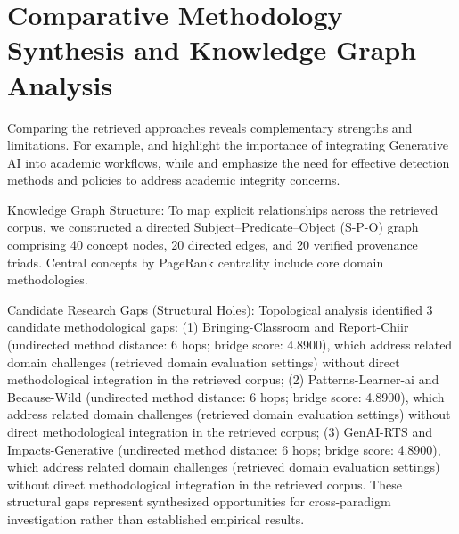 \documentclass[10pt,twocolumn,letterpaper]{article}
\begin{document}
\section{Comparative Methodology Synthesis and Knowledge Graph Analysis}
Comparing the retrieved approaches reveals complementary strengths and limitations. For example, \cite{ref2} and \cite{ref6} highlight the importance of integrating Generative AI into academic workflows, while \cite{ref8} and \cite{ref12} emphasize the need for effective detection methods and policies to address academic integrity concerns.

Knowledge Graph Structure: To map explicit relationships across the retrieved corpus, we constructed a directed Subject–Predicate–Object (S-P-O) graph comprising 40 concept nodes, 20 directed edges, and 20 verified provenance triads. Central concepts by PageRank centrality include core domain methodologies.

Candidate Research Gaps (Structural Holes): Topological analysis identified 3 candidate methodological gaps: (1) Bringing-Classroom and Report-Chiir (undirected method distance: 6 hops; bridge score: 4.8900), which address related domain challenges (retrieved domain evaluation settings) without direct methodological integration in the retrieved corpus; (2) Patterns-Learner-ai and Because-Wild (undirected method distance: 6 hops; bridge score: 4.8900), which address related domain challenges (retrieved domain evaluation settings) without direct methodological integration in the retrieved corpus; (3) GenAI-RTS and Impacts-Generative (undirected method distance: 6 hops; bridge score: 4.8900), which address related domain challenges (retrieved domain evaluation settings) without direct methodological integration in the retrieved corpus. These structural gaps represent synthesized opportunities for cross-paradigm investigation rather than established empirical results.
\end{document}
